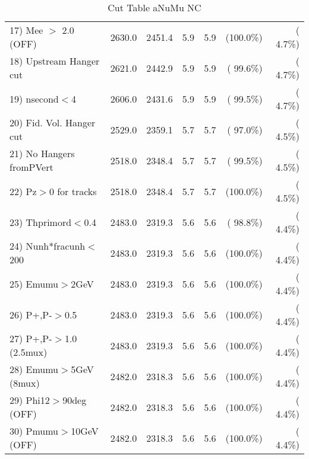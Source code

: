 \begin{table}[h!]
\begin{tabular}{||l||r|r|r|r|r|r||}
 17) Mee $>$ 2.0  (OFF)   &       2630.0 &       2451.4 &          5.9 &          5.9 & (100.0\%) & (  4.7\%) \\
 18) Upstream Hanger cut  &       2621.0 &       2442.9 &          5.9 &          5.9 & ( 99.6\%) & (  4.7\%) \\
 19) nsecond$<$4          &       2606.0 &       2431.6 &          5.9 &          5.9 & ( 99.5\%) & (  4.7\%) \\
 20) Fid. Vol. Hanger cut &       2529.0 &       2359.1 &          5.7 &          5.7 & ( 97.0\%) & (  4.5\%) \\
 21) No Hangers fromPVert &       2518.0 &       2348.4 &          5.7 &          5.7 & ( 99.5\%) & (  4.5\%) \\
 22) Pz$>$0 for tracks    &       2518.0 &       2348.4 &          5.7 &          5.7 & (100.0\%) & (  4.5\%) \\
 23) Thprimord$<$0.4      &       2483.0 &       2319.3 &          5.6 &          5.6 & ( 98.8\%) & (  4.4\%) \\
 24) Nunh*fracunh$<$200   &       2483.0 &       2319.3 &          5.6 &          5.6 & (100.0\%) & (  4.4\%) \\
 25) Emumu$>$2GeV         &       2483.0 &       2319.3 &          5.6 &          5.6 & (100.0\%) & (  4.4\%) \\
 26) P+,P-$>$0.5          &       2483.0 &       2319.3 &          5.6 &          5.6 & (100.0\%) & (  4.4\%) \\
 27) P+,P-$>$1.0 (2.5mux) &       2483.0 &       2319.3 &          5.6 &          5.6 & (100.0\%) & (  4.4\%) \\
 28) Emumu$>$5GeV  (8mux) &       2482.0 &       2318.3 &          5.6 &          5.6 & (100.0\%) & (  4.4\%) \\
 29) Phi12$>$90deg  (OFF) &       2482.0 &       2318.3 &          5.6 &          5.6 & (100.0\%) & (  4.4\%) \\
 30) Pmumu$>$10GeV  (OFF) &       2482.0 &       2318.3 &          5.6 &          5.6 & (100.0\%) & (  4.4\%) \\
 \hline
 \hline
 \end{tabular}
 \caption{Cut Table  aNuMu NC }
 \label{tab-cutCohPi-}
 \end{table}
